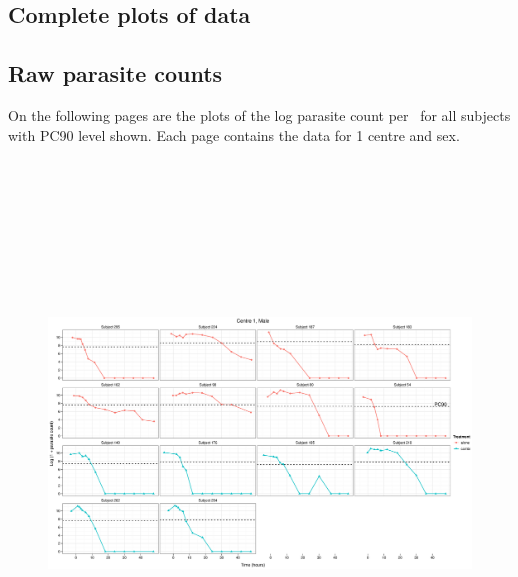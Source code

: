 \begin{singlespace}
\chapter{Complete plots of data}

\section{Raw parasite counts}\label{A:lograwcount}
On the following pages are the plots of the log parasite count per \micro\liter\ for all subjects with PC90 level shown. Each page contains the data for 1 centre and sex.
\begin{figure}
\centering
\includegraphics[height=150mm]{Araw1M.eps}
\end{figure}
\begin{figure}
\centering

\end{figure}
\end{singlespace}
